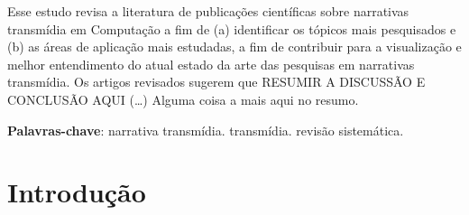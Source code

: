 \documentclass[
article,			%
11pt,				%
oneside,			%
a4paper,			%
english,			%
brazil,				%
sumario=tradicional
]{abntex2}
\begin{document}

  \frenchspacing


  \maketitle

  \begin{resumoumacoluna}
    Esse estudo revisa a literatura de publicações científicas sobre narrativas transmídia em Computação a fim de (a) identificar os tópicos mais pesquisados e (b) as áreas de aplicação mais estudadas, a fim de contribuir para a visualização e melhor entendimento do atual estado da arte das pesquisas em narrativas transmídia. Os artigos revisados sugerem que \textsf{RESUMIR A DISCUSSÃO E CONCLUSÃO AQUI} (\ldots) Alguma coisa a mais aqui no resumo.

    \vspace{\onelineskip}

    \noindent
    \textbf{Palavras-chave}: narrativa transmídia. transmídia. revisão sistemática.
  \end{resumoumacoluna}


  \textual

  \section{Introdução}
\end{document}

